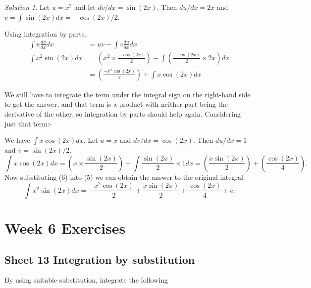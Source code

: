 \documentclass[
  11pt,
  oneside]{book}
\newcommand{\slide}{}
\theoremstyle{definition}
\theoremstyle{definition}
\theoremstyle{definition}
\theoremstyle{definition}
\theoremstyle{remark}
\newtheorem*{solution}{Solution}
\begin{document}
\begin{solution}
Let \(u = x^2\) and let \(dv/dx = \sin(2x)\). Then \(du/dx = 2x\) and \(v = \displaystyle\int \sin(2x)dx = -\cos(2x)/2\).

Using integration by parts.
\begin{align*}
\int u\frac{dv}{dx}dx& = uv-\int v\frac{du}{dx}dx\\
\int x^2\sin(2x)dx&=\left(x^2\times\frac{-\cos(2x)}{2}\right)-\int\left(\frac{-\cos(2x)}{2}\times2x\right)dx\\
&=\left(\frac{-x^2\cos(2x)}{2}\right)+\int x\cos(2x)dx\tag{5}
\end{align*}

We still have to integrate the term under the integral sign on the right-hand side to get the answer, and that term is a product with neither part being the derivative of the other, so integration by parts should help again. Considering just that term:-

\slide

We have \(\displaystyle\int x\cos(2x)dx\). Let \(u=x\) and \(dv/dx = \cos(2x)\). Then \(du/dx = 1\) and \(v=\sin(2x)/2\).
\[
\int x\cos(2x)dx = \left(x\times\frac{\sin(2x)}{2}\right) - \int\frac{\sin(2x)}{2}\times1dx = \left(\frac{x\sin(2x)}2\right)+\left(\frac{\cos(2x)}4\right)\tag{6}.
\]
Now substituting (6) into (5) we can obtain the answer to the original integral
\[
\int x^2\sin(2x)dx = -\frac{x^2\cos(2x)}2+\frac{x\sin(2x)}2+\frac{\cos(2x)}4 + c.
\]
\end{solution}

\chapter*{Week 6 Exercises}\label{week-6-exercises}

\section{Sheet 13 Integration by substitution}\label{sheet-13-integration-by-substitution}

By using suitable substitution, integrate the following
\end{document}
